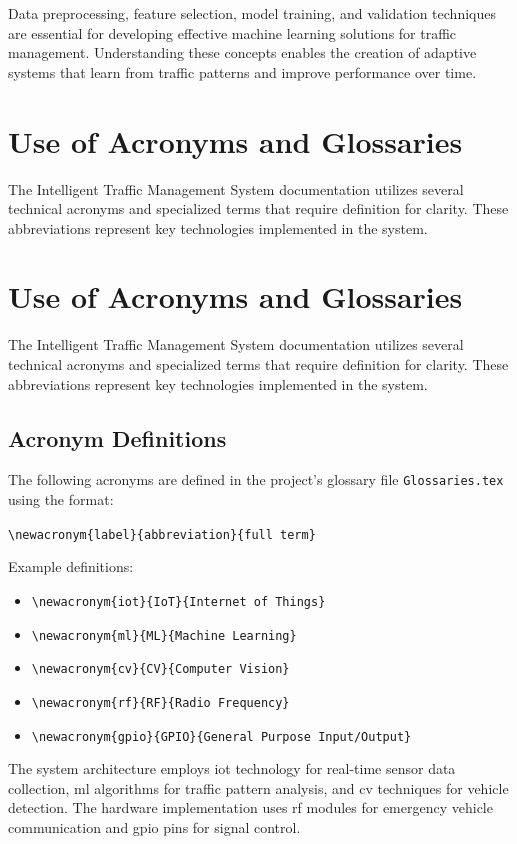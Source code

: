 \documentclass[12pt]{report}
\begin{document}
Data preprocessing, feature selection, model training, and validation techniques are essential for developing effective machine learning solutions for traffic management. Understanding these concepts enables the creation of adaptive systems that learn from traffic patterns and improve performance over time.

\section{Use of Acronyms and Glossaries}
The Intelligent Traffic Management System documentation utilizes several technical acronyms and specialized terms that require definition for clarity. These abbreviations represent key technologies implemented in the system.
\section{Use of Acronyms and Glossaries}
The Intelligent Traffic Management System documentation utilizes several technical acronyms and specialized terms that require definition for clarity. These abbreviations represent key technologies implemented in the system.

\subsection{Acronym Definitions}
The following acronyms are defined in the project's glossary file \texttt{Glossaries.tex} using the format:

\texttt{\textbackslash newacronym\{label\}\{abbreviation\}\{full term\}}

Example definitions:
\begin{itemize}
    \item \texttt{\textbackslash newacronym\{iot\}\{IoT\}\{Internet of Things\}}
    \item \texttt{\textbackslash newacronym\{ml\}\{ML\}\{Machine Learning\}}
    \item \texttt{\textbackslash newacronym\{cv\}\{CV\}\{Computer Vision\}}
    \item \texttt{\textbackslash newacronym\{rf\}\{RF\}\{Radio Frequency\}}
    \item \texttt{\textbackslash newacronym\{gpio\}\{GPIO\}\{General Purpose Input/Output\}}
\end{itemize}

The system architecture employs \gls{iot} technology for real-time sensor data collection, \gls{ml} algorithms for traffic pattern analysis, and \gls{cv} techniques for vehicle detection. The hardware implementation uses \gls{rf} modules for emergency vehicle communication and \gls{gpio} pins for signal control.
\end{document}
